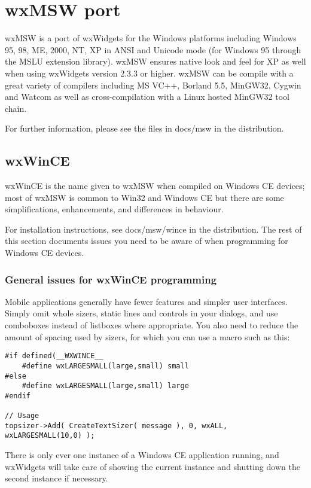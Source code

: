 \section{wxMSW port}\label{wxmswport}

wxMSW is a port of wxWidgets for the Windows platforms
including Windows 95, 98, ME, 2000, NT, XP in ANSI and
Unicode mode (for Windows 95 through the MSLU extension
library). wxMSW ensures native look and feel for XP
as well when using wxWidgets version 2.3.3 or higher.
wxMSW can be compile with a great variety of compilers
including MS VC++, Borland 5.5, MinGW32, Cygwin and
Watcom as well as cross-compilation with a Linux hosted
MinGW32 tool chain.

For further information, please see the files in docs/msw
in the distribution.

\subsection{wxWinCE}\label{wxwince}

wxWinCE is the name given to wxMSW when compiled on Windows CE devices;
most of wxMSW is common to Win32 and Windows CE but there are
some simplifications, enhancements, and differences in
behaviour.

For installation instructions, see docs/msw/wince in the
distribution. The rest of this section documents issues you
need to be aware of when programming for Windows CE devices.

\subsubsection{General issues for wxWinCE programming}

Mobile applications generally have fewer features and
simpler user interfaces. Simply omit whole sizers, static
lines and controls in your dialogs, and use comboboxes instead
of listboxes where appropriate. You also need to reduce
the amount of spacing used by sizers, for which you can
use a macro such as this:

\begin{verbatim}
#if defined(__WXWINCE__
    #define wxLARGESMALL(large,small) small
#else
    #define wxLARGESMALL(large,small) large
#endif

// Usage
topsizer->Add( CreateTextSizer( message ), 0, wxALL, wxLARGESMALL(10,0) );
\end{verbatim}

There is only ever one instance of a Windows CE application running,
and wxWidgets will take care of showing the current instance and
shutting down the second instance if necessary.

